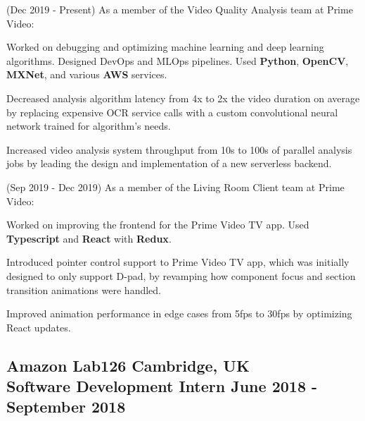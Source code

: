 \documentclass{article}
\begin{document}
\begin{specialitemize}
    \item \textcolor{SubtleText}{(Dec 2019 - Present)} As a member of the Video Quality Analysis team at Prime Video:
    
    \begin{specialitemize}
    	\item Worked on debugging and optimizing machine learning and deep learning algorithms. Designed DevOps and MLOps pipelines.  Used \textbf{Python}, \textbf{OpenCV}, \textbf{MXNet}, and various \textbf{AWS} services.
        \item Decreased analysis algorithm latency from 4x to 2x the video duration on average by replacing expensive OCR service calls with a custom convolutional neural network trained for algorithm's needs.
        \item Increased video analysis system throughput from 10s to 100s of parallel analysis jobs by leading the design and implementation of a new serverless backend.
    \end{specialitemize}
    
    \item \textcolor{SubtleText}{(Sep 2019 - Dec 2019)} As a member of the Living Room Client team at Prime Video:
    
    \begin{specialitemize}
    	\item Worked on improving the frontend for the Prime Video TV app. Used \textbf{Typescript} and \textbf{React} with \textbf{Redux}.
        \item Introduced pointer control support to Prime Video TV app, which was initially designed to only support D-pad, by revamping how component focus and section transition animations were handled.
        \item Improved animation performance in edge cases from 5fps to 30fps by optimizing React updates.
    \end{specialitemize}
\end{specialitemize}

\subsection*{Amazon Lab126 \hfill \textcolor{CompanyLocationText}{Cambridge, UK} \\ \colorbox{RoleBackground}{Software Development Intern} \hfill June 2018 - September 2018}
\end{document}
